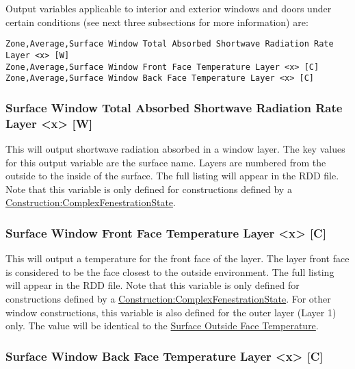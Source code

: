 Output variables applicable to interior and exterior windows and doors under certain conditions (see next three subsections for more information) are:

\begin{lstlisting}
Zone,Average,Surface Window Total Absorbed Shortwave Radiation Rate Layer <x> [W]
Zone,Average,Surface Window Front Face Temperature Layer <x> [C]
Zone,Average,Surface Window Back Face Temperature Layer <x> [C]
\end{lstlisting}

\subsubsection{Surface Window Total Absorbed Shortwave Radiation Rate Layer \textless{}x\textgreater{} {[}W{]}}\label{surface-window-total-absorbed-shortwave-radiation-rate-layer-x-w}

This will output shortwave radiation absorbed in a window layer. The key values for this output variable are the surface name. Layers are numbered from the outside to the inside of the surface. The full listing will appear in the RDD file. Note that this variable is only defined for constructions defined by a \hyperref[constructioncomplexfenestrationstate]{Construction:ComplexFenestrationState}.

\subsubsection{Surface Window Front Face Temperature Layer \textless{}x\textgreater{} {[}C{]}}\label{surface-window-front-face-temperature-layer-x-c}

This will output a temperature for the front face of the layer. The layer front face is considered to be the face closest to the outside environment. The full listing will appear in the RDD file. Note that this variable is only defined for constructions defined by a \hyperref[constructioncomplexfenestrationstate]{Construction:ComplexFenestrationState}.  For other window constructions, this variable is also defined for the outer layer (Layer 1) only. The value will be identical to the \hyperref[surface-outside-face-temperature-c]{Surface Outside Face Temperature}.


\subsubsection{Surface Window Back Face Temperature Layer \textless{}x\textgreater{} {[}C{]}}\label{surface-window-back-face-temperature-layer-x-c}

